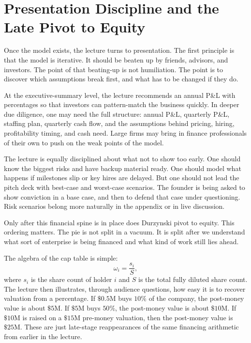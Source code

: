 \section{Presentation Discipline and the Late Pivot to Equity}

Once the model exists, the lecture turns to presentation. The first principle is that the model is iterative. It should be beaten up by friends, advisors, and investors. The point of that beating-up is not humiliation. The point is to discover which assumptions break first, and what has to be changed if they do.

At the executive-summary level, the lecture recommends an annual P\&L with percentages so that investors can pattern-match the business quickly. In deeper due diligence, one may need the full structure: annual P\&L, quarterly P\&L, staffing plan, quarterly cash flow, and the assumptions behind pricing, hiring, profitability timing, and cash need. Large firms may bring in finance professionals of their own to push on the weak points of the model.

The lecture is equally disciplined about what not to show too early. One should know the biggest risks and have backup material ready. One should model what happens if milestones slip or key hires are delayed. But one should not lead the pitch deck with best-case and worst-case scenarios. The founder is being asked to show conviction in a base case, and then to defend that case under questioning. Risk scenarios belong more naturally in the appendix or in live discussion.

Only after this financial spine is in place does Durzynski pivot to equity. This ordering matters. The pie is not split in a vacuum. It is split after we understand what sort of enterprise is being financed and what kind of work still lies ahead.

The algebra of the cap table is simple:
\begin{equation}
\omega_i = \frac{s_i}{S},
\end{equation}
where \(s_i\) is the share count of holder \(i\) and \(S\) is the total fully diluted share count. The lecture then illustrates, through audience questions, how easy it is to recover valuation from a percentage. If \(\$0.5\text{M}\) buys \(10\%\) of the company, the post-money value is about \(\$5\text{M}\). If \(\$5\text{M}\) buys \(50\%\), the post-money value is about \(\$10\text{M}\). If \(\$10\text{M}\) is raised on a \(\$15\text{M}\) pre-money valuation, then the post-money value is \(\$25\text{M}\). These are just late-stage reappearances of the same financing arithmetic from earlier in the lecture.

